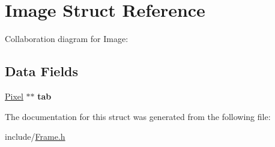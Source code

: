 \hypertarget{struct_image}{\section{Image Struct Reference}
\label{struct_image}
}


Collaboration diagram for Image\+:
\subsection*{Data Fields}
\begin{DoxyCompactItemize}
\item 
\hypertarget{struct_image_a9b3eac4433c1d9a21904c8213fdf7194}{\hyperlink{struct_pixel}{Pixel} $\ast$$\ast$ {\bfseries tab}}\label{struct_image_a9b3eac4433c1d9a21904c8213fdf7194}

\end{DoxyCompactItemize}


The documentation for this struct was generated from the following file\+:\begin{DoxyCompactItemize}
\item 
include/\hyperlink{_frame_8h}{Frame.\+h}\end{DoxyCompactItemize}
